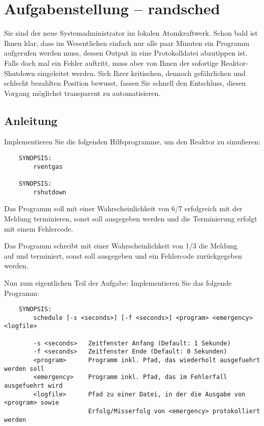 




\section*{Aufgabenstellung -- randsched}

Sie sind der neue Systemadministrator im lokalen Atomkraftwerk. Schon bald ist
Ihnen klar, dass im Wesentlichen einfach nur alle paar Minuten ein Programm
aufgerufen werden muss, dessen Output in eine Protokolldatei abzutippen ist.
Falls doch mal ein Fehler auftritt, muss aber von Ihnen der sofortige
Reaktor-Shutdown eingeleitet werden. Sich Ihrer kritischen, dennoch gefährlichen
und schlecht bezahlten Position bewusst, fassen Sie schnell den Entschluss,
diesen Vorgang möglichst transparent zu automatisieren.

\subsection*{Anleitung}
Implementieren Sie die folgenden Hilfsprogramme, um den Reaktor zu simulieren:

\begin{verbatim}
    SYNOPSIS:
        rventgas

    SYNOPSIS:
        rshutdown
\end{verbatim}

Das Programm  soll mit einer Wahrscheinlichkeit von 6/7
erfolgreich mit der Meldung  terminieren, sonst soll
 ausgegeben werden
und die Terminierung erfolgt mit einem Fehlercode.

Das Programm  schreibt mit einer Wahrscheinlichkeit von 1/3
die Meldung\\
 auf  und terminiert, sonst
soll  ausgegeben und ein Fehlercode zurückgegeben werden.

Nun zum eigentlichen Teil der Aufgabe: Implementieren Sie das folgende Programm:

\begin{verbatim}
    SYNOPSIS:
        schedule [-s <seconds>] [-f <seconds>] <program> <emergency> <logfile>

        -s <seconds>   Zeitfenster Anfang (Default: 1 Sekunde)
        -f <seconds>   Zeitfenster Ende (Default: 0 Sekunden)
        <program>      Programm inkl. Pfad, das wiederholt ausgefuehrt werden soll
        <emergency>    Programm inkl. Pfad, das im Fehlerfall ausgefuehrt wird
        <logfile>      Pfad zu einer Datei, in der die Ausgabe von <program> sowie
                       Erfolg/Misserfolg von <emergency> protokolliert werden
\end{verbatim}

